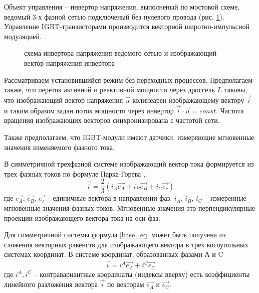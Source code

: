 \documentclass[a4paper]{article}
\begin{document}


Объект управления -- инвертор напряжения, выполненый по мостовой схеме, ведомый 3-х фазной сетью 
подключеный без нулевого провода 
(рис. \ref{invertor_with_grid}).
Управление IGBT-транзисторами производится векторной широтно-импульсной модуляцией. 

\begin{figure}[!ht]

        \caption{схема инвертора напряжения ведомого сетью и изображающий вектор напряжения инвертора}
        \label{invertor_with_grid}
\end{figure}

Рассматриваем установившийся режим без переходных процессов, Предполагаем также, что переток активной и реактивной мощности через
дроссель $L$ таковы, что изображающий вектор напряжения $\vec{u}$ колинеарен изображающему вектору $\vec{i}$ и 
таким образом задан поток мощности через инвертор  $\vec{i}\cdot\vec{u} = const$. 
Частота вращения изображающих векторов синхронизирована с частотой сети.

Также предполагаем, что IGBT-модули имеют датчики, измеряющие мгновенные значения изменяемого фазного тока.


В симметричной трехфазной системе изображающий вектор тока формируется из трех фазных токов по формуле Парка-Горева \cite{Gorev},\cite{Sokolovsky}:
\begin{equation}
\vec{i} = \frac{2}{3}\left( i_A \vec{e_A} + i_B \vec{e_B} + i_C \vec{e_c} \right)
\label{base_eq}
\end{equation}
где  $\vec{e_A}$, $\vec{e_B}$, $\vec{e_c}$ -- единичные вектора в направлении фаз.%
$i_A$, $i_B$, $i_C$ -- измеренные мгновенные значения фазных токов.
Мгновенные значения это перпендикулярные проекции изображающего вектора тока на оси фаз.

Для симметричной системы формула \ref{base_eq} может быть получена из сложения векторных равенств для изображающего вектора в трех косоугольных системах координат.
В системе координат, образованных фазами А и C
$$
\vec{i} = i^A \vec{e_A} + i^C \vec{e_C}
$$
где $i^A, i^C$ -- контравариантные координаты (индексы вверху) есть коэффициенты линейного разложения вектора  $\vec{i}$ по векторам $\vec{e_A}$ и $\vec{e_C}$.
\end{document}
